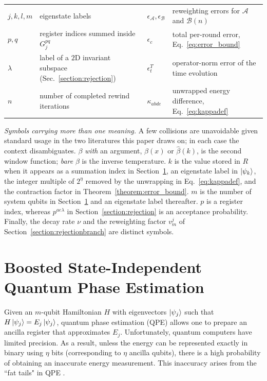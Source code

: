 \documentclass[aps,floatfix,10pt,amssymb,amsfont,amsmath,superscriptaddress,float,nofootinbib,longbibliography,nobalancelastpage,twocolumn]{revtex4-2}
\begin{document}
\begin{table}
\begin{ruledtabular}
\begin{tabular}{ll@{\quad}ll}
$j,k,l,m$ & eigenstate labels & $\epsilon_{\mathcal A},\epsilon_{\mathcal B}$ & reweighting errors for $\mathcal A$ and $\mathcal B(n)$\\
$p,q$ & register indices summed inside $G^{pq}_j$ & $\epsilon_c$ & total per-round error, Eq.~\eqref{eq:error_bound}\\
$\lambda$ & label of a $2$D invariant subspace (Sec.~\ref{section:rejection}) & $\epsilon^T_t$ & operator-norm error of the time evolution\\
$n$ & number of completed rewind iterations & $\kappa_{abde}$ & unwrapped energy difference, Eq.~\eqref{eq:kappadef}\\
\end{tabular}
\end{ruledtabular}
\vspace{2pt}
\footnotesize\noindent\emph{Symbols carrying more than one meaning.} A few collisions are unavoidable given standard usage in the two literatures this paper draws on; in each case the context disambiguates.
$\beta$ \emph{with} an argument, $\beta(x)$ or $\hat\beta(k)$, is the second window function; \emph{bare} $\beta$ is the inverse temperature.
$k$ is the value stored in $R$ when it appears as a summation index in Section~\ref{section:boostedphaseestimation}, an eigenstate label in $\ket{\psi_k}$, the integer multiple of $2^{\eta}$ removed by the unwrapping in Eq.~\eqref{eq:kappadef}, and the contraction factor in Theorem~\ref{theorem:error_bound}.
$m$ is the number of system qubits in Section~\ref{section:boostedphaseestimation} and an eigenstate label thereafter.
$p$ is a register index, whereas $p^{ae\lambda}$ in Section~\ref{section:rejection} is an acceptance probability.
Finally, the decay rate $\nu$ and the reweighting factor $v^j_m$ of Section~\ref{section:rejectionbranch} are distinct symbols.
\end{table}

\section{Boosted State-Independent Quantum Phase Estimation}
\label{section:boostedphaseestimation}
Given an $m$-qubit Hamiltonian $H$ with eigenvectors $\ket{\psi_j}$ such that $H\ket{\psi_j} = E_j \ket{\psi_j}$, quantum phase estimation (QPE) allows one to prepare an ancilla register that approximates $E_j$. Unfortunately, quantum computers have limited precision. As a result, unless the energy can be represented exactly in binary using $\eta$ bits (corresponding to $\eta$ ancilla qubits), there is a high probability of obtaining an inaccurate energy measurement. This inaccuracy arises from the ``fat tails" in QPE \cite{Nielsen_Chuang_2010}.
\end{document}
